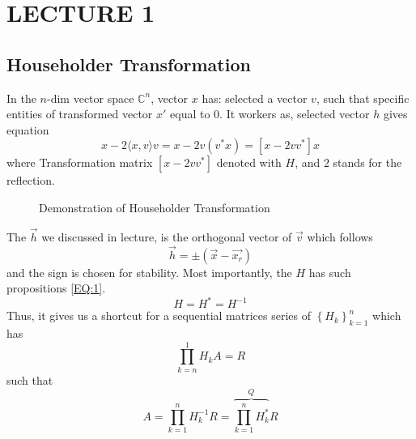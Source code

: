 \chapter{L\normalsize ECTURE 1}
\section{Householder Transformation}
In the $n$-dim vector space $\mathbb{C}^n$, vector $x$ has:
selected a vector $v$, such that specific entities of 
transformed vector $x'$ equal to $0$. 
It workers as, selected vector $h$ gives equation 
\[
    x - 2 \langle x, v\rangle v
    = 
    x - 2 v (v^* x) 
    = 
    \left[
        x - 2vv^*
    \right]
    x
\]
where Transformation matrix 
$\left[
    x - 2vv^*
\right]$ 
denoted with $H$, and $2$ stands for the reflection.
\begin{figure}[H]
    \centering
    \caption{Demonstration of Householder Transformation}
    \label{FIG1}
\end{figure} 
The $\vec{h}$ we discussed in lecture, is the orthogonal vector of $\vec{v}$ 
which follows 
\[
    \vec{h}
    = \pm 
    (\vec{x} - \vec{x_r}) 
\] 
and the sign is chosen for stability.
Most importantly, the $H$ has such propositions \ref{EQ:1}.
\begin{equation}\label{EQ:1}
    H = H^* = H^{-1}
\end{equation}
Thus, it gives us a shortcut 
for a sequential matrices series of $\left\{H_{k}\right\}_{k=1}^{n}$
which has 
\[
    \prod_{k=n}^{1}H_k A = R   
\] 
such that
\[
    A = 
    \prod_{k=1}^{n}H_k^{-1}
    R
    = \overbrace{ 
            \prod_{k=1}^{n}H_k^{*}
    }^{Q} 
    R
\]
